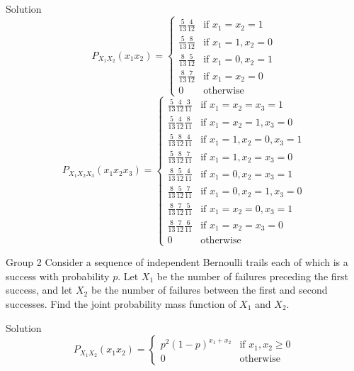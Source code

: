 \documentclass{article}
\begin{document}
\begin{solution}
    {Solution}
    \[
    P_{X_1X_2}(x_1x_2) = {
        \begin{cases}
            \frac{5}{13}\frac{4}{12} & \text{if } x_1=x_2=1\\
            \frac{5}{13}\frac{8}{12} & \text{if } x_1=1, x_2=0\\
            \frac{8}{13}\frac{5}{12} & \text{if } x_1=0, x_2=1\\
            \frac{8}{13}\frac{7}{12} & \text{if } x_1=x_2=0\\
            0 & \text{otherwise}
        \end{cases}
    }
    \]
    \[
        P_{X_1X_2X_3}(x_1x_2x_3) = {
            \begin{cases}
                \frac{5}{13}\frac{4}{12}\frac{3}{11} & \text{if } x_1=x_2=x_3=1\\
                \frac{5}{13}\frac{4}{12}\frac{8}{11} & \text{if } x_1=x_2=1, x_3=0\\
                \frac{5}{13}\frac{8}{12}\frac{4}{11} & \text{if } x_1=1, x_2=0, x_3=1\\
                \frac{5}{13}\frac{8}{12}\frac{7}{11} & \text{if } x_1=1, x_2=x_3=0\\
                \frac{8}{13}\frac{5}{12}\frac{4}{11} & \text{if } x_1=0, x_2=x_3=1\\
                \frac{8}{13}\frac{5}{12}\frac{7}{11} & \text{if } x_1=0, x_2=1, x_3=0\\
                \frac{8}{13}\frac{7}{12}\frac{5}{11} & \text{if } x_1=x_2=0, x_3=1\\
                \frac{8}{13}\frac{7}{12}\frac{6}{11} & \text{if } x_1=x_2=x_3=0\\
                0 & \text{otherwise}
            \end{cases}
        }
    \]
\end{solution}

\begin{problem}
    {Group 2}
    Consider a sequence of independent Bernoulli trails each of which is a success with probability $p$. Let $X_1$ be the number of failures preceding the first success, and let $X_2$ be the number of failures between the first and second successes. Find the joint probability mass function of $X_1$ and $X_2$.
\end{problem}

\begin{solution}
    {Solution}
    \[
        P_{X_1X_2}(x_1x_2) = {
            \begin{cases}
                p^2(1-p)^{x_1+x_2} & \text{if } x_1,x_2\geq 0\\
                0 & \text{otherwise}
            \end{cases}
        }
    \]
\end{solution}
\end{document}
